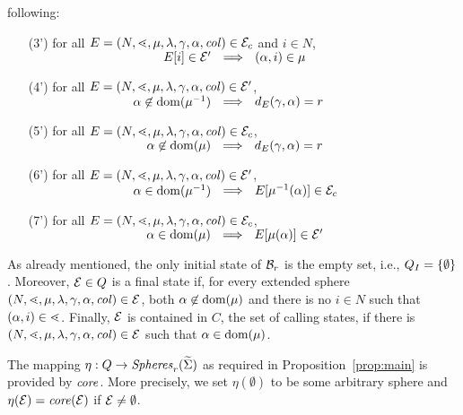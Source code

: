 \documentclass{LMCS}
\begin{document}
\begin{enumerate}[$\bullet$]
  following:\vspace{0.8ex}
  \begin{enumerate}[(1')]\itemsep=1ex
  \item[(3')] for all $E=(N,\mathord{\lessdot},\mu,\lambda,\gamma,\alpha,\mathit{col}) \in
    \mathcal{E}_c$
    and $i \in N$,\vspace{0.5ex}\\
    ${\parbox{14.5em}{\hfill$E[i] \in \State'$}} ~~\Longrightarrow~~
    (\alpha,i) \in \mathord{\mu}$
  \item[(4')] for all $E=(N,\mathord{\lessdot},\mu,\lambda,\gamma,\alpha,\mathit{col}) \in \mathcal{E}'$,\vspace{0.5ex}\\
    ${\parbox{14.5em}{\hfill$\alpha \not\in \dom(\mu^{-1})$}}
    ~~\Longrightarrow~~ d_E(\gamma,\alpha)=\radius$
  \item[(5')] for all $E=(N,\mathord{\lessdot},\mu,\lambda,\gamma,\alpha,\mathit{col}) \in \mathcal{E}_c$,\vspace{0.5ex}\\
    ${\parbox{14.5em}{\hfill$\alpha \not\in \dom(\mu)$}} ~~\Longrightarrow~~
    d_E(\gamma,\alpha)=\radius$
  \item[(6')] for all $E=(N,\mathord{\lessdot},\mu,\lambda,\gamma,\alpha,\mathit{col}) \in
    \mathcal{E}'$,\vspace{0.5ex}\\ ${\parbox{14.5em}{\hfill$\alpha \in
        \dom(\mu^{-1})$}} ~~\Longrightarrow~~ E[\call(\alpha)] \in \cState$
  \item[(7')] for all $E=(N,\mathord{\lessdot},\mu,\lambda,\gamma,\alpha,\mathit{col}) \in
    \mathcal{E}_c$,\vspace{0.5ex}\\ ${\parbox{14.5em}{\hfill$\alpha
        \in \dom(\mu)$}} ~~\Longrightarrow~~ E[\ret(\alpha)] \in
    \State'$\vspace{0.5ex}
\end{enumerate}
\end{enumerate}
As already mentioned, the only initial state of $\mathcal{B}_r$ is the empty
set, i.e., $Q_I = \{\emptyset\}$. Moreover, $\mathcal{E} \in Q$ is a final state
if, for every extended sphere $(N,\mathord{\lessdot},\mu,\lambda,\gamma,\alpha,\mathit{col})
\in \mathcal{E}$, both $\alpha \not\in \mathrm{dom}(\mu)$ and there is no $i \in N$ such
that $(\alpha,i) \in \mathord{\lessdot}$. Finally, $\mathcal{E}$ is contained in $C$, the set
of calling states, if there is $(N,\mathord{\lessdot},\mu,\lambda,\gamma,\alpha,\mathit{col})
\in \mathcal{E}$ such that $\alpha \in \mathrm{dom}(\mu)$.

The mapping $\eta: Q \rightarrow \mathit{Spheres}_r(\widetilde{\Sigma})$ as required in
Proposition~\ref{prop:main} is provided by $\mathit{core}$. More precisely, we set
$\eta(\emptyset)$ to be some arbitrary sphere and $\eta(\mathcal{E})=\mathit{core}(\mathcal{E})$
if $\mathcal{E} \neq \emptyset$.
\end{document}
